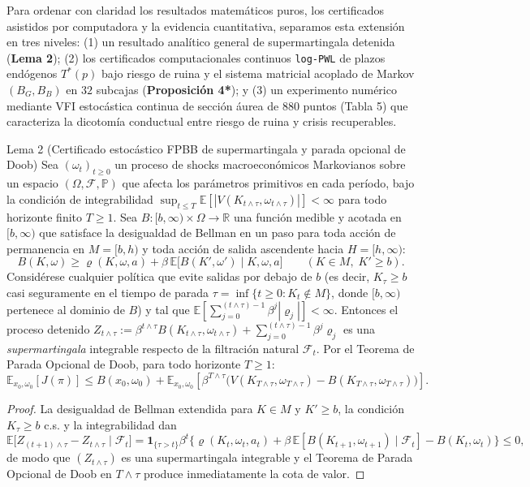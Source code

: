 \documentclass[11pt,letterpaper]{article}
\theoremstyle{plain}
\newtheorem*{namedthm}{\protect\namedthmname}
\newcommand{\namedthmname}{}
\newenvironment{thm_box}[1]{\renewcommand{\namedthmname}{#1}\begin{namedthm}}{\end{namedthm}}
\begin{document}
Para ordenar con claridad los resultados matemáticos puros, los certificados asistidos por computadora y la evidencia cuantitativa, separamos esta extensión en tres niveles: (1) un resultado analítico general de supermartingala detenida (\textbf{Lema 2}); (2) los certificados computacionales continuos \texttt{log-PWL} de plazos endógenos $T^*(p)$ bajo riesgo de ruina y el sistema matricial acoplado de Markov $(B_G, B_B)$ en $32$ subcajas (\textbf{Proposición 4*}); y (3) un experimento numérico mediante VFI estocástica continua de sección áurea de $880$ puntos (Tabla 5) que caracteriza la dicotomía conductual entre riesgo de ruina y crisis recuperables.

\begin{thm_box}{Lema 2 (Certificado estocástico FPBB de supermartingala y parada opcional de Doob)}
Sea $(\omega_t)_{t\ge 0}$ un proceso de shocks macroeconómicos Markovianos sobre un espacio $(\Omega,\mathcal{F},\mathbb{P})$ que afecta los parámetros primitivos en cada período, bajo la condición de integrabilidad $\sup_{t\le T}\mathbb{E}[|V(K_{t\wedge\tau},\omega_{t\wedge\tau})|]<\infty$ para todo horizonte finito $T\ge 1$. Sea $B:[b,\infty)\times\Omega\to\mathbb{R}$ una función medible y acotada en $[b,\infty)$ que satisface la desigualdad de Bellman en un paso para toda acción de permanencia en $M=[b,h)$ y toda acción de salida ascendente hacia $H=[h,\infty)$:
\[
B(K,\omega) \ge \varrho(K,\omega,a) + \beta\,\mathbb{E}\big[B(K',\omega')\mid K,\omega,a\big] \qquad (K\in M,\; K'\ge b).
\]
Considérese cualquier política que evite salidas por debajo de $b$ (es decir, $K_\tau\ge b$ casi seguramente en el tiempo de parada $\tau=\inf\{t\ge 0: K_t\notin M\}$, donde $[b,\infty)$ pertenece al dominio de $B$) y tal que $\mathbb{E}[\sum_{j=0}^{(t\wedge\tau)-1}\beta^j|\varrho_j|]<\infty$. Entonces el proceso detenido $Z_{t\wedge\tau}:=\beta^{t\wedge\tau}B(K_{t\wedge\tau},\omega_{t\wedge\tau})+\sum_{j=0}^{(t\wedge\tau)-1}\beta^j \varrho_j$ es una \emph{supermartingala} integrable respecto de la filtración natural $\mathcal{F}_t$. Por el Teorema de Parada Opcional de Doob, para todo horizonte $T\ge 1$:
\[
\mathbb{E}_{x_0,\omega_0}[J(\pi)] \le B(x_0,\omega_0) + \mathbb{E}_{x_0,\omega_0}\!\left[\beta^{T\wedge\tau}\big(V(K_{T\wedge\tau},\omega_{T\wedge\tau}) - B(K_{T\wedge\tau},\omega_{T\wedge\tau})\big)\right].
\]
\end{thm_box}

\begin{proof}
La desigualdad de Bellman extendida para $K\in M$ y $K'\ge b$, la condición $K_\tau\ge b$ c.s. y la integrabilidad dan
\[
\mathbb{E}\big[Z_{(t+1)\wedge\tau} - Z_{t\wedge\tau} \mid \mathcal{F}_t\big] = \mathbf{1}_{\{\tau>t\}}\beta^t\big\{\varrho(K_t,\omega_t,a_t) + \beta\,\mathbb{E}[B(K_{t+1},\omega_{t+1})\mid\mathcal{F}_t] - B(K_t,\omega_t)\big\} \le 0,
\]
de modo que $(Z_{t\wedge\tau})$ es una supermartingala integrable y el Teorema de Parada Opcional de Doob en $T\wedge\tau$ produce inmediatamente la cota de valor.
\end{proof}
\end{document}
